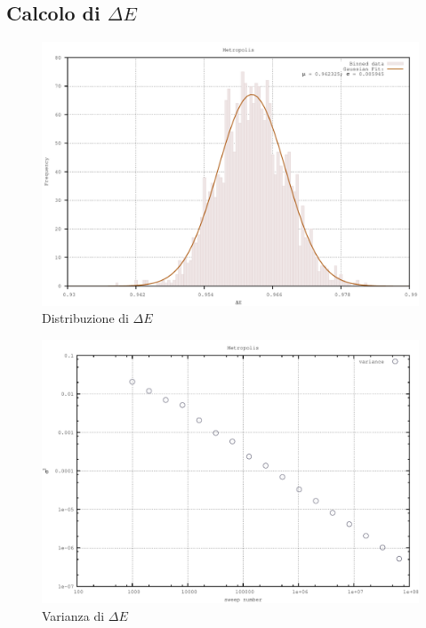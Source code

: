 \subsection{Calcolo di $\Delta E$}

\begin{figure}[H]
\centering
\includegraphics[width=\textwidth]{histogram}
\caption{Distribuzione di $\Delta E$}
\label{fig:histogram}
\end{figure}

\begin{figure}[H]
\centering
\includegraphics[width=\textwidth]{variance}
\caption{Varianza di $\Delta E$}
\label{fig:variance}
\end{figure}


